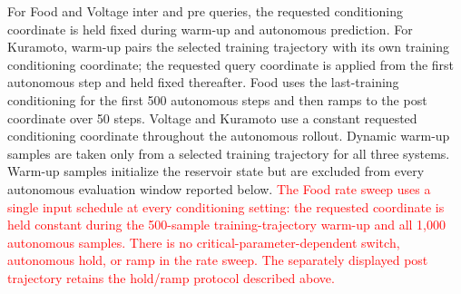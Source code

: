\documentclass[10pt,a4paper]{article}
\begin{document}
For Food and Voltage inter and pre queries, the requested conditioning
coordinate is held fixed during warm-up and autonomous prediction. For
Kuramoto, warm-up pairs the selected training trajectory with its own training
conditioning coordinate; the requested query coordinate is applied from the
first autonomous step and held fixed thereafter. Food uses the last-training
conditioning for the first 500 autonomous steps and then ramps to the post
coordinate over 50 steps. Voltage and Kuramoto use a constant requested
conditioning coordinate throughout the autonomous rollout. Dynamic warm-up
samples are taken only from a selected training trajectory for all three
systems. Warm-up samples initialize the reservoir state but are excluded from
every autonomous evaluation window reported below.
\textcolor{red}{The Food rate sweep uses a single input schedule at every
conditioning setting: the requested coordinate is held constant during the
500-sample training-trajectory warm-up and all 1,000 autonomous samples.
There is no critical-parameter-dependent switch, autonomous hold, or ramp
in the rate sweep. The separately displayed post trajectory retains the
hold/ramp protocol described above.}
\end{document}
